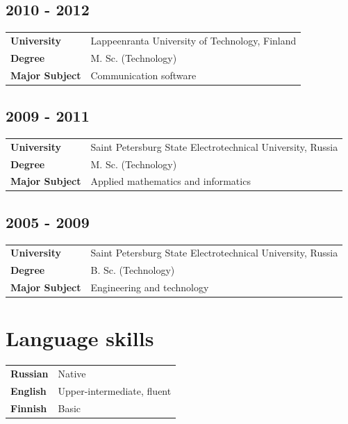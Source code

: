 \documentclass[a4paper,12pt]{article}
\begin{document}
\subsection*{2010 - 2012}

\begin{tabular}{ll}
    \textbf{University} & Lappeenranta University of Technology, Finland \\
    \textbf{Degree} & M. Sc. (Technology) \\
    \textbf{Major Subject} & Communication software
\end{tabular}

\subsection*{2009 - 2011}

\begin{tabular}{ll}
    \textbf{University} & Saint Petersburg State Electrotechnical University, Russia \\
    \textbf{Degree} & M. Sc. (Technology) \\
    \textbf{Major Subject} & Applied mathematics and informatics \\
\end{tabular}

\subsection*{2005 - 2009}

\begin{tabular}{ll}
    \textbf{University} & Saint Petersburg State Electrotechnical University, Russia \\
    \textbf{Degree} & B. Sc. (Technology) \\
    \textbf{Major Subject} & Engineering and technology \\
\end{tabular}


\section*{Language skills}

\begin{tabular}{ll}
    \textbf{Russian} & Native \\
    \textbf{English} & Upper-intermediate, fluent \\
    \textbf{Finnish} & Basic \\
\end{tabular}
\end{document}
